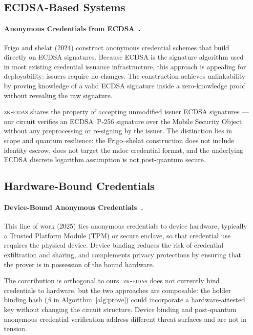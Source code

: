 \subsection{ECDSA-Based Systems}\label{sec:rel-ecdsa}

\paragraph{Anonymous Credentials from ECDSA~\cite{ecdsa-anon}.}
Frigo and shelat (2024) construct anonymous credential schemes that build
directly on ECDSA signatures.  Because ECDSA is the signature algorithm
used in most existing credential issuance infrastructure, this approach is
appealing for deployability: issuers require no changes.  The construction
achieves unlinkability by proving knowledge of a valid ECDSA signature
inside a zero-knowledge proof without revealing the raw signature.

\textsc{zk-eidas} shares the property of accepting unmodified issuer
ECDSA signatures --- our circuit verifies an ECDSA~P-256 signature over
the Mobile Security Object without any preprocessing or re-signing by the
issuer.  The distinction lies in scope and quantum resilience: the
Frigo--shelat construction does not include identity escrow, does not
target the mdoc credential format, and the underlying ECDSA discrete
logarithm assumption is not post-quantum secure.

\subsection{Hardware-Bound Credentials}\label{sec:rel-hardware}

\paragraph{Device-Bound Anonymous Credentials~\cite{device-bound}.}
This line of work (2025) ties anonymous credentials to device hardware,
typically a Trusted Platform Module (TPM) or secure enclave, so that
credential use requires the physical device.  Device binding reduces the
risk of credential exfiltration and sharing, and complements privacy
protections by ensuring that the prover is in possession of the bound
hardware.

The contribution is orthogonal to ours.  \textsc{zk-eidas} does not
currently bind credentials to hardware, but the two approaches are
composable: the holder binding hash ($\beta$ in Algorithm~\ref{alg:prove})
could incorporate a hardware-attested key without changing the circuit
structure.  Device binding and post-quantum anonymous credential
verification address different threat surfaces and are not in tension.

